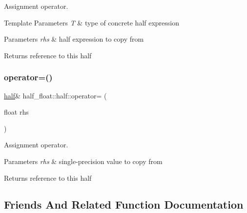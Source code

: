 Assignment operator. 
\begin{DoxyTemplParams}{Template Parameters}
{\em T} & type of concrete half expression \\
\hline
\end{DoxyTemplParams}

\begin{DoxyParams}{Parameters}
{\em rhs} & half expression to copy from \\
\hline
\end{DoxyParams}
\begin{DoxyReturn}{Returns}
reference to this half 
\end{DoxyReturn}
\mbox{\label{classhalf__float_1_1half_a3baf11c1e7ab4f825f182a801d85369a}} 
\subsubsection{\texorpdfstring{operator=()}{operator=()}\hspace{0.1cm}{\footnotesize\ttfamily [2/2]}}
{\footnotesize\ttfamily \hyperlink{classhalf__float_1_1half}{half}\& half\+\_\+float\+::half\+::operator= (\begin{DoxyParamCaption}\item[{float}]{rhs }\end{DoxyParamCaption})\hspace{0.3cm}{\ttfamily [inline]}}

Assignment operator. 
\begin{DoxyParams}{Parameters}
{\em rhs} & single-\/precision value to copy from \\
\hline
\end{DoxyParams}
\begin{DoxyReturn}{Returns}
reference to this half 
\end{DoxyReturn}


\subsection{Friends And Related Function Documentation}
\mbox{\label{classhalf__float_1_1half_a0549e53309bef497d5ce1d1ad89c4bc4}} 
